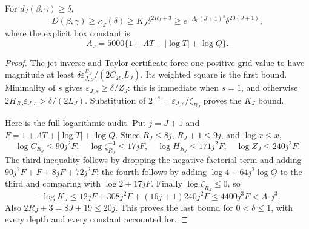 \begin{theorem}
\label{thm:effective-jacobi-stability}
For \(d_J(\beta,\gamma)\ge\delta\),
\begin{equation}
 D(\beta,\gamma)\ge\underline\kappa_J(\delta)
 \ge K_J\delta^{2R_J+3}
 \ge e^{-A_0(J+1)^3}\delta^{20(J+1)},
 \label{eq:kappa-asymptotic-lower}
\end{equation}
where the explicit box constant is
\begin{equation}
 A_0=5000\{1+\Lambda T+|\log T|+\log Q\}.
 \label{eq:explicit-A0}
\end{equation}
\end{theorem}
\begin{proof}
The jet inverse and Taylor certificate force one positive grid value to
have magnitude at least
\(\delta\varepsilon_{J,s}^{R_J}/(2C_{R_J}L_J)\).
Its weighted square is the first bound. Minimality of \(s\) gives
\(\varepsilon_{J,s}\ge\delta/Z_J\): this is immediate when \(s=1\),
and otherwise \(2H_{R_J}\varepsilon_{J,s}>\delta/(2L_J)\).
Substitution of \(2^{-s}=\varepsilon_{J,s}/\zeta_{R_J}\) proves the
\(K_J\) bound.

Here is the full logarithmic audit. Put \(j=J+1\) and
\(F=1+\Lambda T+|\log T|+\log Q\). Since \(R_J\le8j\),
\(R_J+1\le9j\), and \(\log x\le x\),
\[
 \log C_{R_J}\le90j^2F,\quad
 \log\zeta_{R_J}^{-1}\le17jF,\quad
 \log H_{R_J}\le171j^2F,\quad
 \log Z_J\le240j^2F.
\]
The third inequality follows by dropping the negative factorial term and
adding \(90j^2F+F+8jF+72j^2F\); the fourth follows by adding
\(\log4+64j^2\log Q\) to the third and comparing with
\(\log2+17jF\). Finally \(\log\zeta_{R_J}\le0\), so
\[
 -\log K_J\le
 12jF+308j^2F+(16j+1)240j^2F\le4400j^3F<A_0j^3.
\]
Also \(2R_J+3=8J+19\le20j\). This proves the last bound for
\(0<\delta\le1\), with every depth and every constant accounted for.
\end{proof}

